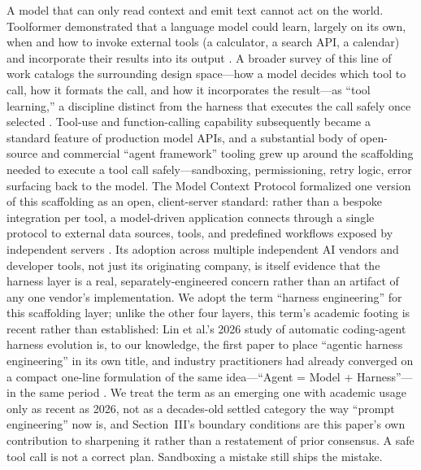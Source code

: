 \documentclass[journal]{IEEEtran}
\begin{document}
A model that can only read context and emit text cannot act on the world. Toolformer demonstrated that a language model could learn, largely on its own, when and how to invoke external tools (a calculator, a search API, a calendar) and incorporate their results into its output \cite{schick2023toolformer}. A broader survey of this line of work catalogs the surrounding design space---how a model decides which tool to call, how it formats the call, and how it incorporates the result---as ``tool learning,'' a discipline distinct from the harness that executes the call safely once selected \cite{qin2023tool}. Tool-use and function-calling capability subsequently became a standard feature of production model APIs, and a substantial body of open-source and commercial ``agent framework'' tooling grew up around the scaffolding needed to execute a tool call safely---sandboxing, permissioning, retry logic, error surfacing back to the model. The Model Context Protocol formalized one version of this scaffolding as an open, client-server standard: rather than a bespoke integration per tool, a model-driven application connects through a single protocol to external data sources, tools, and predefined workflows exposed by independent servers \cite{anthropic2024mcp}. Its adoption across multiple independent AI vendors and developer tools, not just its originating company, is itself evidence that the harness layer is a real, separately-engineered concern rather than an artifact of any one vendor's implementation. We adopt the term ``harness engineering'' for this scaffolding layer; unlike the other four layers, this term's academic footing is recent rather than established: Lin et al.'s 2026 study of automatic coding-agent harness evolution is, to our knowledge, the first paper to place ``agentic harness engineering'' in its own title, and industry practitioners had already converged on a compact one-line formulation of the same idea---``Agent = Model + Harness''---in the same period \cite{lin2026agentic,trivedy2026anatomy}. We treat the term as an emerging one with academic usage only as recent as 2026, not as a decades-old settled category the way ``prompt engineering'' now is, and Section~III's boundary conditions are this paper's own contribution to sharpening it rather than a restatement of prior consensus. A safe tool call is not a correct plan. Sandboxing a mistake still ships the mistake.
\end{document}
